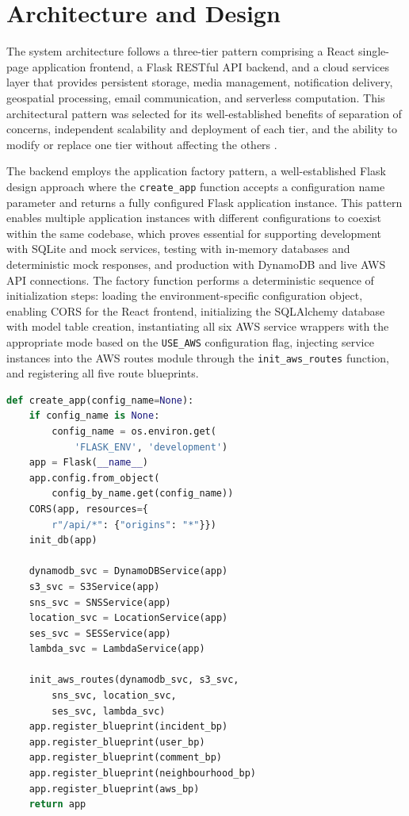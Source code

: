 \documentclass[conference]{IEEEtran}
\begin{document}
\section{Architecture and Design}

The system architecture follows a three-tier pattern comprising a React single-page application frontend, a Flask RESTful API backend, and a cloud services layer that provides persistent storage, media management, notification delivery, geospatial processing, email communication, and serverless computation. This architectural pattern was selected for its well-established benefits of separation of concerns, independent scalability and deployment of each tier, and the ability to modify or replace one tier without affecting the others \cite{grinberg2018flask}.

The backend employs the application factory pattern, a well-established Flask design approach where the \texttt{create\_app} function accepts a configuration name parameter and returns a fully configured Flask application instance. This pattern enables multiple application instances with different configurations to coexist within the same codebase, which proves essential for supporting development with SQLite and mock services, testing with in-memory databases and deterministic mock responses, and production with DynamoDB and live AWS API connections. The factory function performs a deterministic sequence of initialization steps: loading the environment-specific configuration object, enabling CORS for the React frontend, initializing the SQLAlchemy database with model table creation, instantiating all six AWS service wrappers with the appropriate mode based on the \texttt{USE\_AWS} configuration flag, injecting service instances into the AWS routes module through the \texttt{init\_aws\_routes} function, and registering all five route blueprints.

\begin{lstlisting}[language=Python, caption=Application factory with service initialization]
def create_app(config_name=None):
    if config_name is None:
        config_name = os.environ.get(
            'FLASK_ENV', 'development')
    app = Flask(__name__)
    app.config.from_object(
        config_by_name.get(config_name))
    CORS(app, resources={
        r"/api/*": {"origins": "*"}})
    init_db(app)

    dynamodb_svc = DynamoDBService(app)
    s3_svc = S3Service(app)
    sns_svc = SNSService(app)
    location_svc = LocationService(app)
    ses_svc = SESService(app)
    lambda_svc = LambdaService(app)

    init_aws_routes(dynamodb_svc, s3_svc,
        sns_svc, location_svc,
        ses_svc, lambda_svc)
    app.register_blueprint(incident_bp)
    app.register_blueprint(user_bp)
    app.register_blueprint(comment_bp)
    app.register_blueprint(neighbourhood_bp)
    app.register_blueprint(aws_bp)
    return app
\end{lstlisting}
\end{document}
